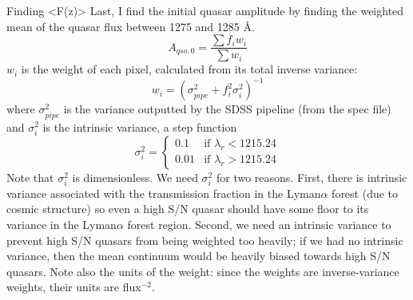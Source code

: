 \documentclass[12pt]{aastex}
\begin{document}
\begin{section}{Finding <F(z)>}
Last, I find the initial quasar amplitude by finding the weighted mean of the quasar flux between 1275 and 1285 \AA.
\begin{equation}
A_{qso,0} = \frac{\sum f_i w_i}{\sum w_i}
\label{eqn:a0}
\end{equation}
$w_i$ is the weight of each pixel, calculated from its total inverse variance:
\begin{equation}
w_i = \left(\sigma_{pipe}^2 + f_i^2 \sigma_{i}^2\right)^{-1}
\label{eqn:wt_for_a0}
\end{equation}
where $\sigma_{pipe}^2$ is the variance outputted by the SDSS pipeline (from the spec file) and $\sigma_{i}^2$ is the intrinsic variance,
a step function
\begin{equation}
\sigma_i^2 = 
\begin{cases}
0.1 & \text{if } \lambda_r < 1215.24 \\
0.01 & \text{if } \lambda_r > 1215.24
\end{cases}
\end{equation}
Note that $\sigma_i^2$ is dimensionless.  We need $\sigma_{i}^2$ for two reasons.
First, there is intrinsic variance associated with the transmission fraction in the Lyman$\alpha$ forest (due to cosmic structure)
so even a high S/N quasar should have some floor to its variance in the Lyman$\alpha$ forest region.
Second, we need an intrinsic variance to prevent high S/N quasars from being weighted too heavily; if we had no intrinsic variance,
then the mean continuum would be heavily biased towards high S/N quasars.  Note also the units of the weight: since the weights are inverse-variance
weights, their units are flux$^{-2}$.



\end{section}
\end{document}
